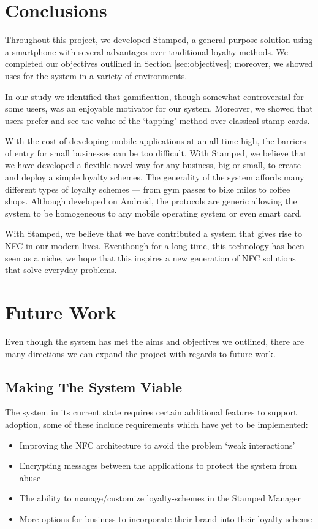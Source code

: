 \section{Conclusions}
Throughout this project, we developed Stamped, a general purpose solution using a smartphone with several advantages over traditional loyalty methods. We completed our objectives outlined in Section \ref{sec:objectives}; moreover, we showed uses for the system in a variety of environments.

In our study we identified that gamification, though somewhat controversial for some users, was an enjoyable motivator for our system. Moreover, we showed that users prefer and see the value of the `tapping' method over classical stamp-cards.  

With the cost of developing mobile applications at an all time high, the barriers of entry for small businesses can be too difficult. With Stamped, we believe that we have developed a flexible novel way for any business, big or small, to create and deploy a simple loyalty schemes. The generality of the system affords many different types of loyalty schemes --- from gym passes to bike miles to coffee shops. Although developed on Android, the protocols are generic allowing the system to be homogeneous to any mobile operating system or even smart card.

With Stamped, we believe that we have contributed a system that gives rise to NFC in our modern lives. Eventhough for a long time, this technology has been seen as a niche, we hope that this inspires a new generation of NFC solutions that solve everyday problems. 

\section{Future Work}
Even though the system has met the aims and objectives we outlined, there are many directions we can expand the project with regards to future work.
\subsection{Making The System Viable}
The system in its current state requires certain additional features to support adoption, some of these include requirements which have yet to be implemented:
\begin{itemize}
	\item Improving the NFC architecture to avoid the problem `weak interactions' 
	\item Encrypting messages between the applications to protect the system from abuse
	\item The ability to manage/customize loyalty-schemes in the Stamped Manager
	\item More options for business to incorporate their brand into their loyalty scheme
\end{itemize}


